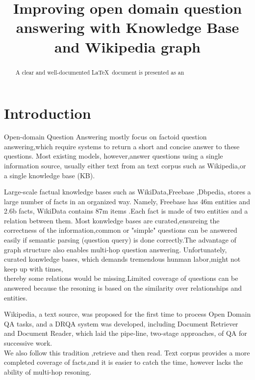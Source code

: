 \documentclass[sigconf]{acmart}
\begin{document}
	
	\title{Improving open domain question answering with Knowledge Base and Wikipedia graph}
	
	
	
	
	\begin{abstract}
		A clear and well-documented \LaTeX\ document is presented as an
		
	\end{abstract}
	
	
	\maketitle
	
	\section{Introduction}
	Open-domain  Question Answering mostly focus on factoid question answering,which require systems to return a short and concise answer to these questions.
	Most existing models, however,answer questions using a single information
	source, usually either text from an text corpus such as Wikipedia\cite{chen2017reading},or a single knowledge base (KB).	
	
	Large-scale factual knowledge bases such as WikiData\cite{vrandevcic2014wikidata},Freebase \cite{bollacker2008freebase},Dbpedia\cite{auer2007dbpedia}, stores a large number of facts in an organized way. Namely, Freebase has 46m entities and 2.6b facts, WikiData contains 87m items .Each fact is made of two entities and a relation between them. Most konwledge bases are curated,ensureing the correctness of the information,common or "simple" questions can be answered easily if semantic parsing (question query)  is done correctly.The advantage of graph structure also enables multi-hop question answering.
	Unfortunately, curated konwledge bases, which demands tremendous hunman labor,might not keep up with times,\\thereby some relations would be missing.Limited coverage of questions  can be answered because the resoning is based on the similarity over relationships and entities.	
	
	Wikipedia\cite{chen2017reading}, a text source, was proposed for the first time to process Open Domain QA tasks, and a DRQA system was developed, including Document Retriever and Document Reader, which laid the pipe-line, two-stage approaches, of QA for successive work.\\We also follow this tradition ,retrieve and then read. 		
	Text corpus provides a more completed coverage of facts,and it is easier to catch the time, however lacks the ability of multi-hop resoning.
	
\end{document}
